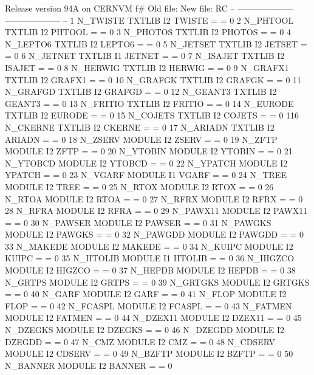 \begin{XMPt}{Release version 94A on CERNVM}
 f# Old file:              New file:            RC
 -- --------------------   -------------------- --
 1  N_TWISTE TXTLIB   I2   TWISTE   =        =  0
 2  N_PHTOOL TXTLIB   I2   PHTOOL   =        =  0
 3  N_PHOTOS TXTLIB   I2   PHOTOS   =        =  0
 4  N_LEPTO6 TXTLIB   I2   LEPTO6   =        =  0
 5  N_JETSET TXTLIB   I2   JETSET   =        =  0
 6  N_JETNET TXTLIB   I1   JETNET   =        =  0
 7  N_ISAJET TXTLIB   I2   ISAJET   =        =  0
 8  N_HERWIG TXTLIB   I2   HERWIG   =        =  0
 9  N_GRAFX1 TXTLIB   I2   GRAFX1   =        =  0
 10 N_GRAFGK TXTLIB   I2   GRAFGK   =        =  0
 11 N_GRAFGD TXTLIB   I2   GRAFGD   =        =  0
 12 N_GEANT3 TXTLIB   I2   GEANT3   =        =  0
 13 N_FRITIO TXTLIB   I2   FRITIO   =        =  0
 14 N_EURODE TXTLIB   I2   EURODE   =        =  0
 15 N_COJETS TXTLIB   I2   COJETS   =        =  0
116 N_CKERNE TXTLIB   I2   CKERNE   =        =  0
 17 N_ARIADN TXTLIB   I2   ARIADN   =        =  0
 18 N_ZSERV  MODULE   I2   ZSERV    =        =  0
 19 N_ZFTP   MODULE   I2   ZFTP     =        =  0
 20 N_YTOBIN MODULE   I2   YTOBIN   =        =  0
 21 N_YTOBCD MODULE   I2   YTOBCD   =        =  0
 22 N_YPATCH MODULE   I2   YPATCH   =        =  0
 23 N_VGARF  MODULE   I1   VGARF    =        =  0
 24 N_TREE   MODULE   I2   TREE     =        =  0
 25 N_RTOX   MODULE   I2   RTOX     =        =  0
 26 N_RTOA   MODULE   I2   RTOA     =        =  0
 27 N_RFRX   MODULE   I2   RFRX     =        =  0
 28 N_RFRA   MODULE   I2   RFRA     =        =  0
 29 N_PAWX11 MODULE   I2   PAWX11   =        =  0
 30 N_PAWSER MODULE   I2   PAWSER   =        =  0
 31 N_PAWGKS MODULE   I2   PAWGKS   =        =  0
 32 N_PAWGDD MODULE   I2   PAWGDD   =        =  0
 33 N_MAKEDE MODULE   I2   MAKEDE   =        =  0
 34 N_KUIPC  MODULE   I2   KUIPC    =        =  0
 35 N_HTOLIB MODULE   I1   HTOLIB   =        =  0
 36 N_HIGZCO MODULE   I2   HIGZCO   =        =  0
 37 N_HEPDB  MODULE   I2   HEPDB    =        =  0
 38 N_GRTPS  MODULE   I2   GRTPS    =        =  0
 39 N_GRTGKS MODULE   I2   GRTGKS   =        =  0
 40 N_GARF   MODULE   I2   GARF     =        =  0
 41 N_FLOP   MODULE   I2   FLOP     =        =  0
 42 N_FCASPL MODULE   I2   FCASPL   =        =  0
 43 N_FATMEN MODULE   I2   FATMEN   =        =  0
 44 N_DZEX11 MODULE   I2   DZEX11   =        =  0
 45 N_DZEGKS MODULE   I2   DZEGKS   =        =  0
 46 N_DZEGDD MODULE   I2   DZEGDD   =        =  0
 47 N_CMZ    MODULE   I2   CMZ      =        =  0
 48 N_CDSERV MODULE   I2   CDSERV   =        =  0
 49 N_BZFTP  MODULE   I2   BZFTP    =        =  0
 50 N_BANNER MODULE   I2   BANNER   =        =  0
 

\end{XMPt}
